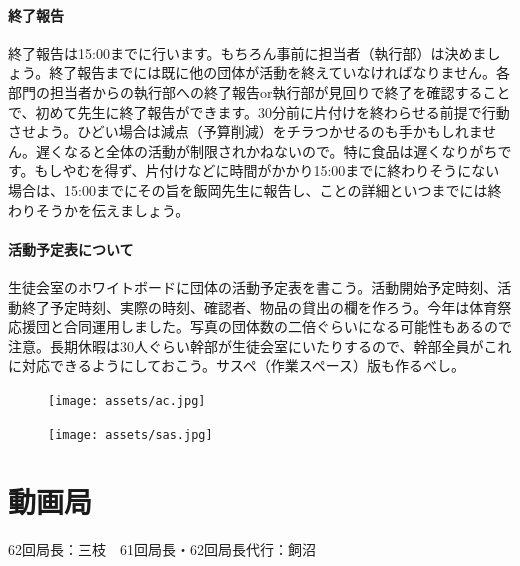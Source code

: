 \documentclass[dvipdfmx,jb5]{jarticle}
\begin{document}
\subsection{終了報告}
終了報告は15:00までに行います。もちろん事前に担当者（執行部）は決めましょう。終了報告までには既に他の団体が活動を終えていなければなりません。各部門の担当者からの執行部への終了報告or執行部が見回りで終了を確認することで、初めて先生に終了報告ができます。30分前に片付けを終わらせる前提で行動させよう。ひどい場合は減点（予算削減）をチラつかせるのも手かもしれません。遅くなると全体の活動が制限されかねないので。特に食品は遅くなりがちです。もしやむを得ず、片付けなどに時間がかかり15:00までに終わりそうにない場合は、15:00までにその旨を飯岡先生に報告し、ことの詳細といつまでには終わりそうかを伝えましょう。

\subsection{活動予定表について}
生徒会室のホワイトボードに団体の活動予定表を書こう。活動開始予定時刻、活動終了予定時刻、実際の時刻、確認者、物品の貸出の欄を作ろう。今年は体育祭応援団と合同運用しました。写真の団体数の二倍ぐらいになる可能性もあるので注意。長期休暇は30人ぐらい幹部が生徒会室にいたりするので、幹部全員がこれに対応できるようにしておこう。サスペ（作業スペース）版も作るべし。
\begin{figure}[h]
\begin{center}
  \texttt{[image: assets/ac.jpg]}
\end{center}
\end{figure}
\begin{figure}[h]
\begin{center}
\texttt{[image: assets/sas.jpg]}
\end{center}
\end{figure}

\newpage
\part{動画局}
62回局長：三枝　61回局長・62回局長代行：飼沼
\end{document}
